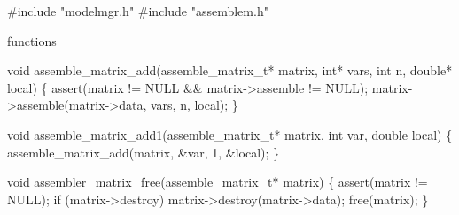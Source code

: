 #include "modelmgr.h"
#include "assemblem.h"

\LA{}functions~{\nwtagstyle{}}\RA{}
\nwendcode{}\nwdocspar

\nwenddocs{}\endmoddef
void assemble_matrix_add(assemble_matrix_t* matrix, int* vars, int n, 
                         double* local)
\{
    assert(matrix != NULL && matrix->assemble != NULL);
    matrix->assemble(matrix->data, vars, n, local);
\}

void assemble_matrix_add1(assemble_matrix_t* matrix, int var, double local)
\{
    assemble_matrix_add(matrix, &var, 1, &local);
\}

void assembler_matrix_free(assemble_matrix_t* matrix)
\{
    assert(matrix != NULL);
    if (matrix->destroy)
        matrix->destroy(matrix->data);
    free(matrix);
\}

\nwendcode{}

%
%
%
%
%
\nwdocspar
\nwenddocs{}
